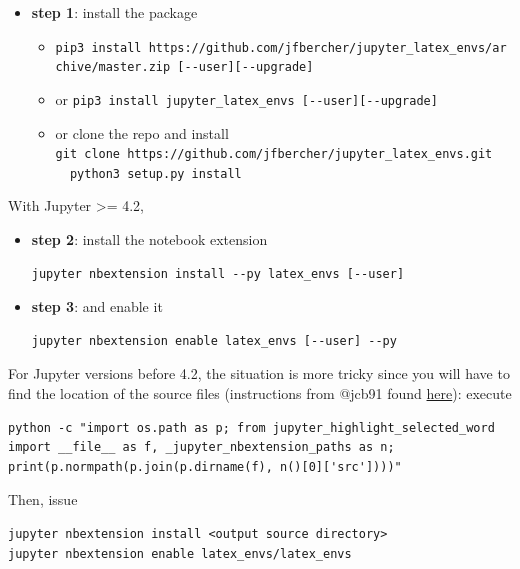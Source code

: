 \begin{itemize}
\tightlist
\item
  \textbf{step 1}: install the package

  \begin{itemize}
  \tightlist
  \item
    \texttt{pip3\ install\ https://github.com/jfbercher/jupyter\_latex\_envs/archive/master.zip\ {[}-\/-user{]}{[}-\/-upgrade{]}}
  \item
    { or}
    \texttt{pip3\ install\ jupyter\_latex\_envs\ {[}-\/-user{]}{[}-\/-upgrade{]}}
  \item
    { or} clone the repo and install
    \texttt{git\ clone\ https://github.com/jfbercher/jupyter\_latex\_envs.git\ \ \ \ python3\ setup.py\ install}
  \end{itemize}
\end{itemize}

With Jupyter \textgreater{}= 4.2,

\begin{itemize}
\item
  \textbf{step 2}: install the notebook extension

\begin{verbatim}
jupyter nbextension install --py latex_envs [--user]
\end{verbatim}
\item
  \textbf{step 3}: and enable it

\begin{verbatim}
jupyter nbextension enable latex_envs [--user] --py
\end{verbatim}
\end{itemize}

For Jupyter versions before 4.2, the situation is more tricky since you
will have to find the location of the source files (instructions from
@jcb91 found
\href{https://github.com/jcb91/jupyter_highlight_selected_word}{here}):
execute

\begin{verbatim}
python -c "import os.path as p; from jupyter_highlight_selected_word import __file__ as f, _jupyter_nbextension_paths as n; print(p.normpath(p.join(p.dirname(f), n()[0]['src'])))"
\end{verbatim}

Then, issue

\begin{verbatim}
jupyter nbextension install <output source directory>
jupyter nbextension enable latex_envs/latex_envs
\end{verbatim}

